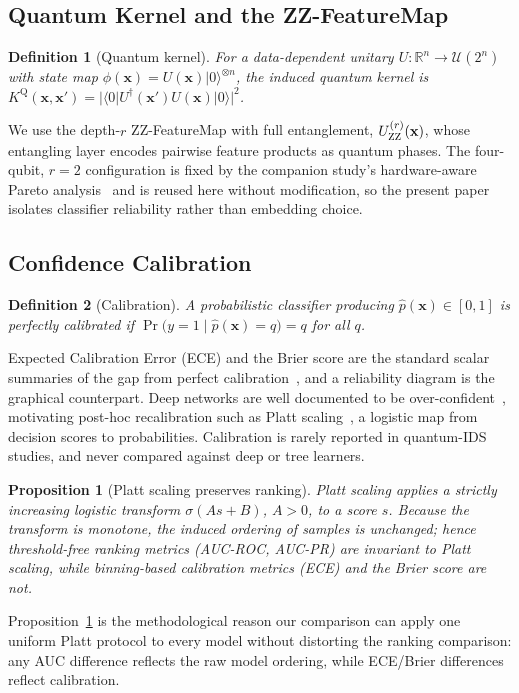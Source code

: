 \documentclass[journal]{IEEEtran}
\newtheorem{definition}{Definition}
\newtheorem{proposition}{Proposition}
\newcommand{\ZZ}{\textsc{ZZ}}
\begin{document}
\subsection{Quantum Kernel and the \ZZ{}-FeatureMap}
\begin{definition}[Quantum kernel]
For a data-dependent unitary $U:\mathbb{R}^n\!\to\!\mathcal{U}(2^n)$ with
state map $\phi(\mathbf{x})=U(\mathbf{x})|0\rangle^{\otimes n}$, the
induced quantum kernel is
$K^{\mathrm{Q}}(\mathbf{x},\mathbf{x}')=
|\langle 0|U^{\dagger}(\mathbf{x}')U(\mathbf{x})|0\rangle|^2$.
\end{definition}
We use the depth-$r$ \ZZ{}-FeatureMap with full entanglement,
$U^{(r)}_{\ZZ}(\mathbf{x})$, whose entangling layer encodes pairwise
feature products as quantum phases. The four-qubit, $r{=}2$
configuration is fixed by the companion study's hardware-aware Pareto
analysis~\cite{companion} and is reused here without modification, so the
present paper isolates classifier reliability rather than embedding
choice.

\subsection{Confidence Calibration}
\begin{definition}[Calibration]
A probabilistic classifier producing $\hat{p}(\mathbf{x})\in[0,1]$ is
\emph{perfectly calibrated} if
$\Pr\!\big(y{=}1\mid\hat{p}(\mathbf{x}){=}q\big)=q$ for all $q$.
\end{definition}
Expected Calibration Error (ECE) and the Brier score are the standard
scalar summaries of the gap from perfect
calibration~\cite{naeini2015ece,brier1950}, and a reliability diagram is
the graphical counterpart. Deep networks are well documented to be
over-confident~\cite{guo2017calibration}, motivating post-hoc
recalibration such as Platt scaling~\cite{platt1999svm}, a logistic map
from decision scores to probabilities. Calibration is rarely reported in
quantum-IDS studies, and never compared against deep or tree learners.

\begin{proposition}[Platt scaling preserves ranking]
\label{prop:platt}
Platt scaling applies a strictly increasing logistic transform
$\sigma(As+B)$, $A{>}0$, to a score $s$. Because the transform is
monotone, the induced ordering of samples is unchanged; hence
threshold-free ranking metrics (AUC-ROC, AUC-PR) are invariant to Platt
scaling, while binning-based calibration metrics (ECE) and the Brier
score are not.
\end{proposition}
Proposition~\ref{prop:platt} is the methodological reason our comparison
can apply one uniform Platt protocol to every model without distorting
the ranking comparison: any AUC difference reflects the raw model
ordering, while ECE/Brier differences reflect calibration.
\end{document}
